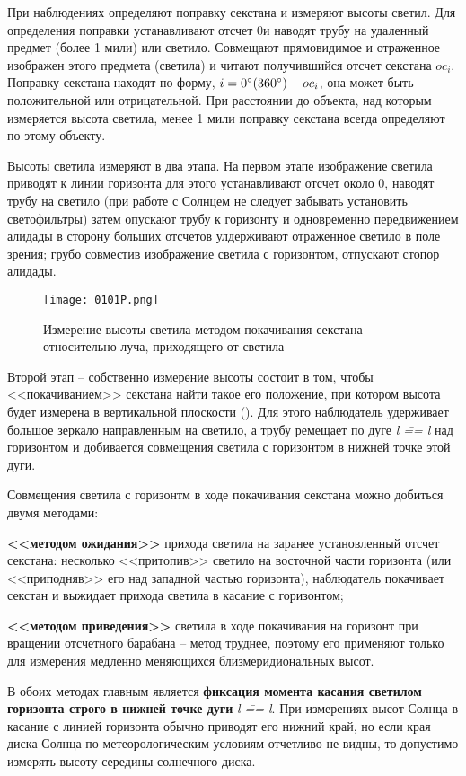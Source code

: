 При наблюдениях определяют поправку секстана и измеряют высоты
светил. Для определения поправки устанавливают отсчет 0\gr и наводят
трубу на удаленный предмет (более 1 мили) или светило. Совмещают
прямовидимое и отраженное изображен этого предмета (светила) и читают
получившийся отсчет секстана $oc_i$. Поправку секстана находят по форму,
$i = 0^\circ (360^\circ) - oc_i$, она может быть положительной или
отрицательной. При расстоянии до объекта, над которым измеряется
высота светила, менее 1 мили поправку секстана всегда определяют по
этому объекту.

Высоты светила измеряют в два этапа. На первом этапе изображение
светила приводят к линии горизонта для этого устанавливают отсчет
около 0\gr, наводят трубу на светило (при работе с Солнцем не следует
забывать установить светофильтры) затем опускают трубу к горизонту и
одновременно передвижением алидады в сторону больших отсчетов
улдерживают отраженное светило в поле зрения; грубо совместив
изображение светила с горизонтом, отпускают стопор алидады.

\begin{figure*}[!htb]
  \centering
  \texttt{[image: 0101P.png]}
  \caption{Измерение высоты светила методом покачивания секстана
    относительно луча, приходящего от светила}
  \label{fig:101}
\end{figure*}

Второй этап \--- собственно измерение высоты состоит в том, чтобы
<<покачиванием>> секстана найти такое его положение, при котором высота
будет измерена в вертикальной плоскости (). Для этого
наблюдатель удерживает большое зеркало направленным на светило, а
трубу ремещает по дуге \textit{l \=== l} над горизонтом и добивается совмещения
светила с горизонтом в нижней точке этой дуги.

Совмещения светила с горизонтм в ходе покачивания секстана можно добиться двумя методами:

\textbf{<<методом ожидания>>} прихода светила на заранее установленный
отсчет секстана: несколько <<притопив>> светило на восточной части
горизонта (или <<приподняв>> его над западной частью горизонта),
наблюдатель покачивает секстан и выжидает прихода светила в касание с
горизонтом;

\textbf{<<методом приведения>>} светила в ходе покачивания на горизонт
при вращении отсчетного барабана \--- метод труднее, поэтому его
применяют только для измерения медленно меняющихся близмеридиональных
высот.

В обоих методах главным является \textbf{фиксация момента касания светилом
горизонта строго в нижней точке дуги} \textit{l \=== l}. При измерениях
высот Солнца в касание с линией горизонта обычно приводят его нижний
край, но если края диска Солнца по метеорологическим условиям
отчетливо не видны, то допустимо измерять высоту середины солнечного
диска.

